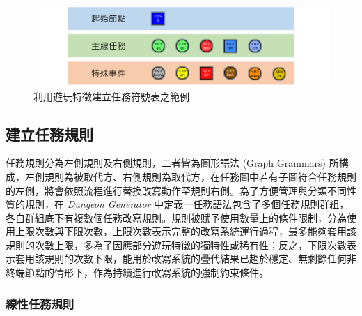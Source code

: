 \begin{figure}[ht]
  \begin{center}
    \includegraphics[width=1.0\textwidth]{figures/missiongrammars-alphabet.png}
    \caption{利用遊玩特徵建立任務符號表之範例} 
    \label{fig:missiongrammars-alphabet}
  \end{center}
\end{figure}




\subsection{建立任務規則}
\label{ssec:method-missiongrammars-rules}

任務規則分為左側規則及右側規則，二者皆為圖形語法 (Graph Grammars) 所構成，左側規則為被取代方、右側規則為取代方，在任務圖中若有子圖符合任務規則的左側，將會依照流程進行替換改寫動作至規則右側。為了方便管理與分類不同性質的規則，在 \textit{Dungeon Generator} 中定義一任務語法包含了多個任務規則群組，各自群組底下有複數個任務改寫規則。規則被賦予使用數量上的條件限制，分為使用上限次數與下限次數，上限次數表示完整的改寫系統運行過程，最多能夠套用該規則的次數上限，多為了因應部分遊玩特徵的獨特性或稀有性；反之，下限次數表示套用該規則的次數下限，能用於改寫系統的疊代結果已趨於穩定、無剩餘任何非終端節點的情形下，作為持續進行改寫系統的強制約束條件。

\subsubsection{線性任務規則}
\label{sssec:method-missiongrammars-rules-linearrules}

